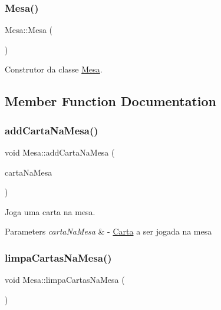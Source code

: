 \subsubsection{\texorpdfstring{Mesa()}{Mesa()}}
{\footnotesize\ttfamily Mesa\+::\+Mesa (\begin{DoxyParamCaption}{ }\end{DoxyParamCaption})}



Construtor da classe \mbox{\hyperlink{class_mesa}{Mesa}}. 



\subsection{Member Function Documentation}
\mbox{\label{class_mesa_a9678402ee3dac7430aae29269cc88138}} 
\subsubsection{\texorpdfstring{addCartaNaMesa()}{addCartaNaMesa()}}
{\footnotesize\ttfamily void Mesa\+::add\+Carta\+Na\+Mesa (\begin{DoxyParamCaption}\item[{\mbox{\hyperlink{class_carta_na_mesa}{Carta\+Na\+Mesa}} $\ast$}]{carta\+Na\+Mesa }\end{DoxyParamCaption})}



Joga uma carta na mesa. 


\begin{DoxyParams}{Parameters}
{\em carta\+Na\+Mesa} & -\/ \mbox{\hyperlink{class_carta}{Carta}} a ser jogada na mesa \\
\hline
\end{DoxyParams}
\mbox{\label{class_mesa_a77676cb0d95846a226ee905b8e5fcb53}} 
\subsubsection{\texorpdfstring{limpaCartasNaMesa()}{limpaCartasNaMesa()}}
{\footnotesize\ttfamily void Mesa\+::limpa\+Cartas\+Na\+Mesa (\begin{DoxyParamCaption}{ }\end{DoxyParamCaption})}



